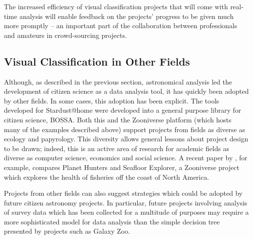\documentclass{ar2e}
\begin{document}
The increased  efficiency of visual classification projects that will come with
real-time analysis will enable feedback on the projects' progress to be given
much more promptly -- an important part of the collaboration between
professionals and amateurs in crowd-sourcing projects.



\subsection{Visual Classification in Other Fields}
\label{sec:class:non-astro}

Although, as described in the previous section, astronomical analysis led the
development of citizen science as a data analysis tool, it has quickly been
adopted by other fields. In some cases, this adoption has been explicit. The
tools developed for Stardust@home were developed into a general purpose
library for citizen science, BOSSA.
Both this and the Zooniverse platform (which hosts many of the examples
described above) support projects from fields as diverse as ecology and
papyrology. This diversity allows general lessons about project
design to be drawn; indeed, this is an active area of research for academic
fields as diverse as computer science, economics and social science. A recent paper
by \citet{Mugar}, for example, compares Planet Hunters and Seafloor Explorer, 
a Zooniverse project which explores the health of fisheries off the coast of
North America. 



Projects from other fields can also suggest strategies which could be adopted
by future citizen astronomy projects. In particular, future projects involving
analysis of survey data which has been collected for a multitude of purposes
may require a more sophisticated model for data analysis than the simple
decision tree presented by projects such as Galaxy Zoo. 

\end{document}
